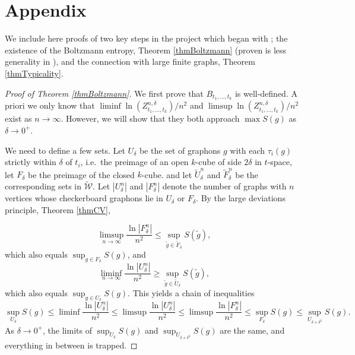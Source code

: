 \documentclass[12pt]{amsart}
\newcommand{\tdens}{\tau}
\newcommand{\1}{\mathbf{1}}
\newcommand{\www}{{\mathcal W}}
\begin{document}
\section*{Appendix}

We include here proofs of two key steps in the project which began
with \cite{RS1}; the existence
of the Boltzmann entropy, Theorem \ref{thmBoltzmann} (proven is less
generality in \cite{RS1,RS2}), and the
connection with large finite graphs, Theorem \ref{thmTypicality}.



\begin{proof}[Proof of Theorem \ref{thmBoltzmann}] We first prove that 
$B_{t_1,\ldots,t_k}$ is well-defined.
A priori we only know that $\liminf\ln
  (Z_{t_1,\ldots,t_k}^{n,\delta})/n^2$ and $\limsup\ln (Z_{t_1,\ldots,t_k}^{n,\delta})/n^2$
  exist as ${n\to\infty}$. However, we will show that they both
  approach $\max S(g)$ as $\delta \to 0^+$.

  We need to define a few sets. Let $U_\delta$ be the set of graphons
  $g$ with each $\tdens_i(g)$ strictly within $\delta$ of $t_i$,
  i.e.\ the preimage of an open $k$-cube of side $2\delta$ in
  $t$-space, let $F_\delta$ be the preimage of the closed
  $k$-cube. and let $\tilde U_\delta^n$ and $\tilde F_\delta^n$ be the corresponding sets 
  in $\widetilde \www$. Let $|U_\delta^n|$ and
  $|F_\delta^n|$ denote the number of graphs with $n$ vertices whose
  checkerboard graphons lie in $U_\delta$ or
  $F_\delta$. By the large deviations principle, Theorem \ref{thmCV},

  \begin{equation} \limsup_{n \to \infty} \frac{\ln|F_\delta^n|}{n^2}
    \le \sup_{\tilde g\in \tilde F_\delta} S(\tilde g),\end{equation}
  which also equals $\sup_{g \in F_\delta} S(g)$, and 
  \begin{equation} \liminf_{n \to \infty} \frac{\ln|U_\delta^n|}{n^2}
    \ge \sup_{\tilde g \in \tilde U_\delta} S(\tilde g),\end{equation}
  which also equals $\sup_{g \in U_\delta} S(g)$.  This yields a
  chain of inequalities
  \begin{equation} \sup_{U_\delta} S(g) \le \liminf
    \frac{\ln|U^n_\delta|}{n^2} \le \limsup
    \frac{\ln|U^n_\delta|}{n^2} \le \limsup
    \frac{\ln|F_\delta^n|}{n^2} \le  \sup_{F_\delta} S(g) \le 
    \sup_{U_{\delta+\delta^2}} S(g).\end{equation} As $\delta \to 0^+$,
  the limits of $\sup_{U_\delta} S(g)$ and
  $\sup_{U_{\delta+\delta^2}} S(g)$ are the same, and everything in
  between is trapped.


\end{proof}
\end{document}
